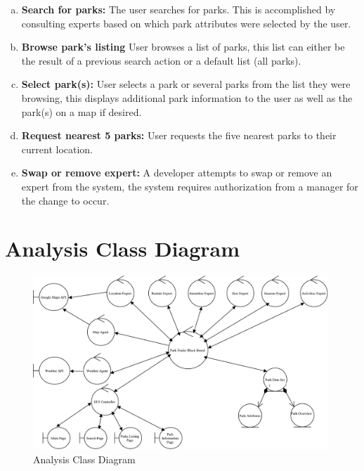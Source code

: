 \documentclass[titlepage,12pt]{article}
\begin{document}
\begin{enumerate}[a)]
    \item \textbf{Search for parks:} The user searches for parks. This is accomplished by consulting
    experts based on which park attributes were selected by the user.
    \item \textbf{Browse park's listing} User browses a list of parks, this list can either be the
    result of a previous search action or a default list (all parks).
    \item \textbf{Select park(s):} User selects a park or several parks from the list they were
    browsing, this displays additional park information to the user as well as the park(s) on a map
    if desired.
    \item \textbf{Request nearest 5 parks:} User requests the five nearest parks to their current
    location.
    \item \textbf{Swap or remove expert:} A developer attempts to swap or remove an expert from the
    system, the system requires authorization from a manager for the change to occur.
\end{enumerate}


\section{Analysis Class Diagram}
\label{sec:analysis_class_diagram}

\begin{figure}[H]
	\centerline{\includegraphics[width=0.99\textwidth]{images//analysis_class_diagram}}
	\caption{Analysis Class Diagram}
	\label{analysisClassDiagram}
\end{figure}

\end{document}
